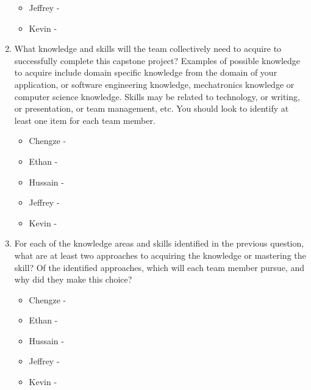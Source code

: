 \begin{enumerate}
\begin{itemize}
        \item Jeffrey - 
        \item Kevin - 
  \end{itemize} 
  \item What knowledge and skills will the team collectively need to acquire to
  successfully complete this capstone project?  Examples of possible knowledge
  to acquire include domain specific knowledge from the domain of your
  application, or software engineering knowledge, mechatronics knowledge or
  computer science knowledge.  Skills may be related to technology, or writing,
  or presentation, or team management, etc.  You should look to identify at
  least one item for each team member.
  \begin{itemize}
        \item Chengze - 
        \item Ethan - 
        \item Hussain - 
        \item Jeffrey - 
        \item Kevin - 
  \end{itemize} 
  \item For each of the knowledge areas and skills identified in the previous
  question, what are at least two approaches to acquiring the knowledge or
  mastering the skill?  Of the identified approaches, which will each team
  member pursue, and why did they make this choice?
  \begin{itemize}
        \item Chengze - 
        \item Ethan - 
        \item Hussain - 
        \item Jeffrey - 
        \item Kevin - 
  \end{itemize} 
\end{enumerate}
